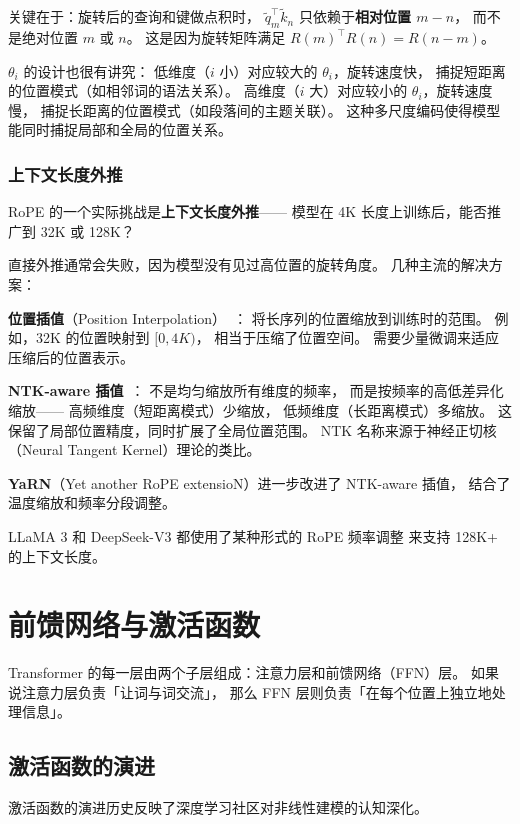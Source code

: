 关键在于：旋转后的查询和键做点积时，
$\tilde{q}_m^\top \tilde{k}_n$ 只依赖于\textbf{相对位置 $m - n$}，
而不是绝对位置 $m$ 或 $n$。
这是因为旋转矩阵满足 $R(m)^\top R(n) = R(n - m)$。

$\theta_i$ 的设计也很有讲究：
低维度（$i$ 小）对应较大的 $\theta_i$，旋转速度快，
捕捉短距离的位置模式（如相邻词的语法关系）。
高维度（$i$ 大）对应较小的 $\theta_i$，旋转速度慢，
捕捉长距离的位置模式（如段落间的主题关联）。
这种多尺度编码使得模型能同时捕捉局部和全局的位置关系。

\subsubsection{上下文长度外推}

RoPE 的一个实际挑战是\textbf{上下文长度外推}——
模型在 4K 长度上训练后，能否推广到 32K 或 128K？

直接外推通常会失败，因为模型没有见过高位置的旋转角度。
几种主流的解决方案：

\textbf{位置插值}（Position Interpolation）~\cite{chen2023extending}：
将长序列的位置缩放到训练时的范围。
例如，32K 的位置映射到 $[0, 4K)$，
相当于压缩了位置空间。
需要少量微调来适应压缩后的位置表示。

\textbf{NTK-aware 插值}~\cite{bloc97ntk}：
不是均匀缩放所有维度的频率，
而是按频率的高低差异化缩放——
高频维度（短距离模式）少缩放，
低频维度（长距离模式）多缩放。
这保留了局部位置精度，同时扩展了全局位置范围。
NTK 名称来源于神经正切核（Neural Tangent Kernel）理论的类比。

\textbf{YaRN}（Yet another RoPE extensioN）进一步改进了 NTK-aware 插值，
结合了温度缩放和频率分段调整。

LLaMA 3 和 DeepSeek-V3 都使用了某种形式的 RoPE 频率调整
来支持 128K+ 的上下文长度。

\section{前馈网络与激活函数}

Transformer 的每一层由两个子层组成：注意力层和前馈网络（FFN）层。
如果说注意力层负责「让词与词交流」，
那么 FFN 层则负责「在每个位置上独立地处理信息」。

\subsection{激活函数的演进}

激活函数的演进历史反映了深度学习社区对非线性建模的认知深化。

